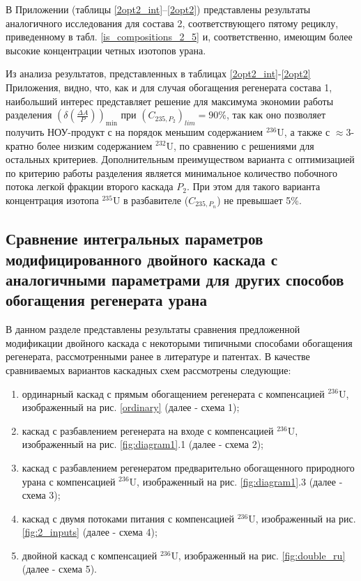 В Приложении (таблицы \ref{2opt2_int}--\ref{2opt2}) представлены результаты аналогичного исследования для состава 2, соответствующего пятому рециклу, приведенному в табл. \ref{is_compositions_2_5} и, соответственно, имеющим более высокие концентрации четных изотопов урана.


Из анализа результатов, представленных в таблицах \ref{2opt2_int}-\ref{2opt2} Приложения, видно, что, как и для случая обогащения регенерата состава 1, наибольший интерес представляет решение для максимума экономии работы разделения $(\delta(\frac{\Delta A}{P}))_\text{min}$ при $({C_{235,{P_2}}})_{lim}=90\%$, так как оно позволяет получить НОУ-продукт с на порядок меньшим содержанием $^{236}$U, а также с $\approx$3-кратно более низким содержанием $^{232}$U, по сравнению с решениями для остальных критериев.
Дополнительным преимуществом варианта с оптимизацией по критерию работы разделения является минимальное количество побочного потока легкой фракции второго каскада $P_2$. 
При этом для такого варианта концентрация изотопа $^{235}$U в разбавителе ($C_{235,P_{n}}$) не превышает 5\%.

\subsection{Сравнение интегральных параметров модифицированного двойного каскада с аналогичными параметрами для других способов обогащения регенерата урана}\label{integral_comp}

В данном разделе представлены результаты сравнения предложенной модификации двойного каскада с некоторыми типичными способами обогащения регенерата, рассмотренными ранее в литературе и патентах. В качестве сравниваемых вариантов каскадных схем рассмотрены следующие: 

\begin{enumerate}
    \item ординарный каскад с прямым обогащением регенерата с компенсацией $^{236}$U, изображенный на рис. \ref{ordinary} (далее - схема 1);
    \item каскад с разбавлением регенерата на входе с компенсацией $^{236}$U, изображенный на рис. \ref{fig:diagram1}.1 (далее - схема 2);
    \item каскад с разбавлением регенератом предварительно обогащенного природного урана с компенсацией $^{236}$U, изображенный на рис. \ref{fig:diagram1}.3 (далее - схема 3);
    \item каскад с двумя потоками питания с компенсацией $^{236}$U, изображенный на рис. \ref{fig:2_inputs} (далее - схема 4);
    \item двойной каскад с компенсацией $^{236}$U, изображенный на рис. \ref{fig:double_ru} (далее - схема 5).
\end{enumerate}

